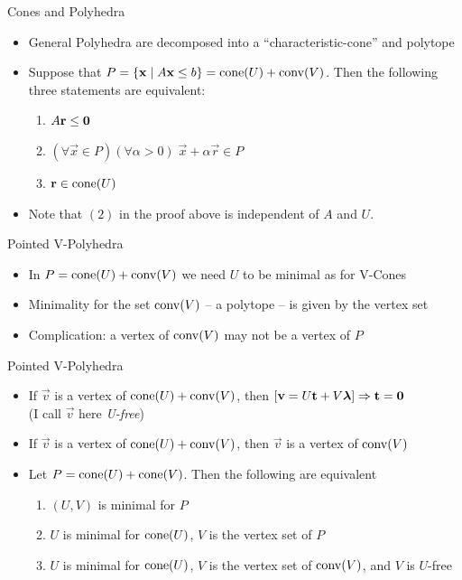 \documentclass{beamer}
\begin{document}
\begin{frame}{Cones and Polyhedra}
\begin{itemize}
  \item<1-> General Polyhedra are decomposed into a ``characteristic-cone'' and polytope
  \item<2-> Suppose that $P = \left\{\mathbf{x}\;|\; A\mathbf{x}\leq b\right\} = \operatorname{cone}(U) + \operatorname{conv}(V)$.  Then the following three statements are equivalent:
    \begin{enumerate}
      \item $A\mathbf{r}\leq\mathbf{0}$
      \item $(\forall \vec{x}\in P)(\forall \alpha > 0)\;\vec{x} + \alpha\vec{r} \in P$
      \item $\mathbf{r} \in \operatorname{cone}(U)$
    \end{enumerate}
  \item<3-> Note that $(2)$ in the proof above is independent of $A$ and $U$.
\end{itemize}
\end{frame}

\begin{frame}{Pointed V-Polyhedra}
\begin{itemize}
  \item<1-> In $P = \operatorname{cone}(U)+\operatorname{conv}(V)$ we need $U$ to be minimal as for V-Cones
  \item<2-> Minimality for the set $\operatorname{conv}(V)$ -- a polytope -- is given by the vertex set
  \item<3-> Complication: a vertex of $\operatorname{conv}(V)$ may not be a vertex of $P$
\end{itemize}
\end{frame}

\begin{frame}{Pointed V-Polyhedra}
\begin{itemize}
	\item<1-> If $\vec{v}$ is a vertex of $\operatorname{cone}(U) + \operatorname{conv}(V)$, then $[\mathbf{v} = U\mathbf{t} + V\bm{\lambda}] \Rightarrow \mathbf{t} = \mathbf{0}$  \\
  (I call $\vec{v}$ here \textit{U-free})
  \item<2-> If $\vec{v}$ is a vertex of $\operatorname{cone}(U) + \operatorname{conv}(V)$, then $\vec{v}$ is a vertex of $\operatorname{conv}(V)$
	\item<3-> Let $P = \operatorname{cone}(U)+ \operatorname{cone}(V)$.  Then the following are equivalent
    \begin{enumerate}
      \item $(U,V)$ is minimal for $P$
      \item $U$ is minimal for $\operatorname{cone}(U)$, $V$ is the vertex set of $P$
      \item $U$ is minimal for $\operatorname{cone}(U)$, $V$ is the vertex set of $\operatorname{conv}(V)$, and $V$ is $U$-free
    \end{enumerate}

\end{itemize}
\end{frame}
\end{document}
